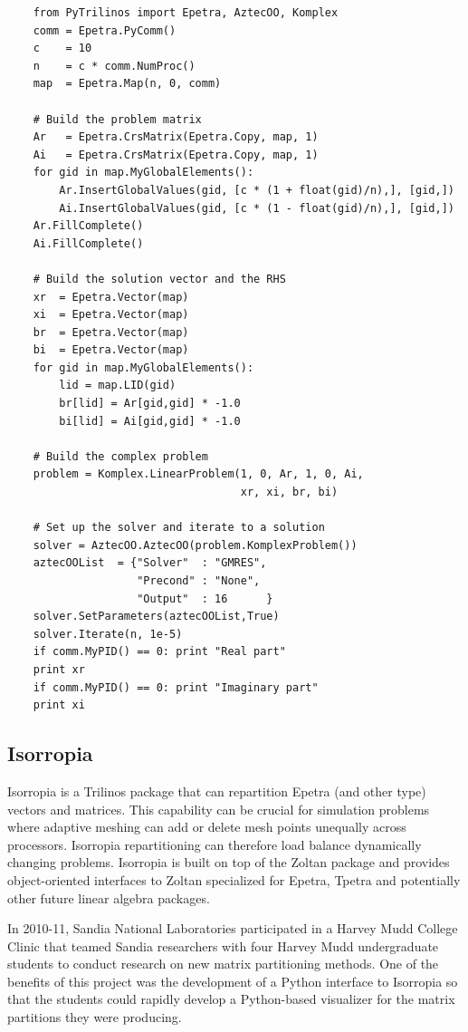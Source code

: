 \documentclass[11pt]{article}
\begin{document}
\begin{verbatim}
    from PyTrilinos import Epetra, AztecOO, Komplex
    comm = Epetra.PyComm()
    c    = 10
    n    = c * comm.NumProc()
    map  = Epetra.Map(n, 0, comm)
    
    # Build the problem matrix
    Ar   = Epetra.CrsMatrix(Epetra.Copy, map, 1)
    Ai   = Epetra.CrsMatrix(Epetra.Copy, map, 1)
    for gid in map.MyGlobalElements():
        Ar.InsertGlobalValues(gid, [c * (1 + float(gid)/n),], [gid,])
        Ai.InsertGlobalValues(gid, [c * (1 - float(gid)/n),], [gid,])
    Ar.FillComplete()
    Ai.FillComplete()

    # Build the solution vector and the RHS
    xr  = Epetra.Vector(map)
    xi  = Epetra.Vector(map)
    br  = Epetra.Vector(map)
    bi  = Epetra.Vector(map)
    for gid in map.MyGlobalElements():
        lid = map.LID(gid)
        br[lid] = Ar[gid,gid] * -1.0
        bi[lid] = Ai[gid,gid] * -1.0

    # Build the complex problem
    problem = Komplex.LinearProblem(1, 0, Ar, 1, 0, Ai,
                                    xr, xi, br, bi)

    # Set up the solver and iterate to a solution
    solver = AztecOO.AztecOO(problem.KomplexProblem())
    aztecOOList  = {"Solver"  : "GMRES",
                    "Precond" : "None",
                    "Output"  : 16      }
    solver.SetParameters(aztecOOList,True)
    solver.Iterate(n, 1e-5)
    if comm.MyPID() == 0: print "Real part"
    print xr
    if comm.MyPID() == 0: print "Imaginary part"
    print xi
\end{verbatim}

\subsection{Isorropia}
\label{sec:isorropia}

Isorropia is a Trilinos package that can repartition Epetra (and other type) vectors and matrices.  This capability can be crucial for simulation problems where adaptive meshing can add or delete mesh points unequally across processors.  Isorropia repartitioning can therefore load balance dynamically changing problems.  Isorropia is built on top of the Zoltan package and provides object-oriented interfaces to Zoltan specialized for Epetra, Tpetra and potentially other future linear algebra packages.

In 2010-11, Sandia National Laboratories participated in a Harvey Mudd College Clinic that teamed Sandia researchers with four Harvey Mudd undergraduate students to conduct research on new matrix partitioning methods.  One of the benefits of this project was the development of a Python interface to Isorropia so that the students could rapidly develop a Python-based visualizer for the matrix partitions they were producing.
\end{document}
